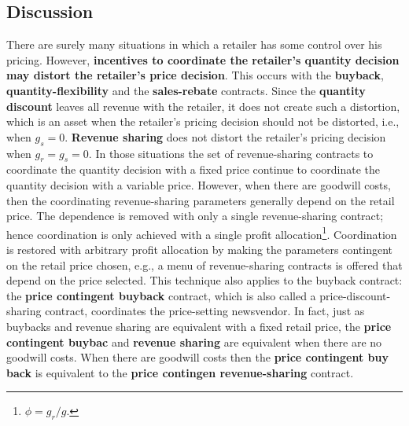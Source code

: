 \subsection{Discussion}
There are surely many situations in which a retailer has some control over his pricing. However, \textbf{incentives to coordinate the retailer's quantity decision may distort the retailer's price decision}. This occurs with the \textbf{buyback}, \textbf{quantity-flexibility} and the \textbf{sales-rebate} contracts. Since the \textbf{quantity discount} leaves all revenue with the retailer, it does not create such a distortion, which is an asset when the retailer's pricing decision should not be distorted, i.e., when $g_s=0$. \textbf{Revenue sharing} does not distort the retailer's pricing decision when $g_r=g_s=0$. In those situations the set of revenue-sharing contracts to coordinate the quantity decision with a fixed price continue to coordinate the quantity decision with a variable price. However, when there are goodwill costs, then the coordinating revenue-sharing parameters generally depend on the retail price. The dependence is removed with only a single revenue-sharing contract; hence coordination is only achieved with a single profit allocation\footnote{$\phi=g_r/g$.}. Coordination is restored with arbitrary profit allocation by making the parameters contingent on the retail price chosen, e.g., a menu of revenue-sharing contracts is offered that depend on the price selected. This technique also applies to the buyback contract: the \textbf{price contingent buyback} contract, which is also called a price-discount-sharing contract, coordinates the price-setting newsvendor. In fact, just as buybacks and revenue sharing are equivalent with a fixed retail price, the \textbf{price contingent buybac} and \textbf{revenue sharing} are equivalent when there are no goodwill costs. When there are goodwill costs then the \textbf{price contingent buy back} is equivalent to the \textbf{price contingen revenue-sharing}  contract.

















